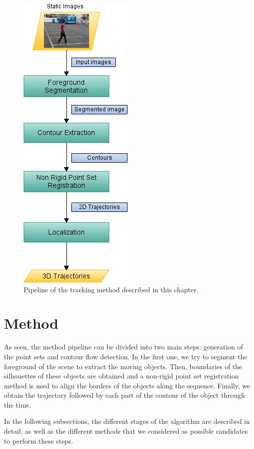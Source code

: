 \begin{figure}[h!]
  \centering
  \includegraphics{pipeline}
  \caption{Pipeline of the tracking method described in this chapter.}\label{fig:cp02_pipeline}
\end{figure}

\section{Method}\label{ch:chapter02_01}

As seen, the method pipeline can be divided into two main steps: generation of the point sets and contour flow detection. In the first one, we try to segment the foreground of the scene to extract the moving objects. Then, boundaries of the silhouettes of these objects are obtained and a non-rigid point set registration method is used to align the borders of the objects along the sequence. Finally, we obtain the trajectory followed by each part of the contour of the object through the time.

In the following subsections, the different stages of the algorithm are described in detail, as well as the different methods that we considered as possible candidates to perform these steps.

